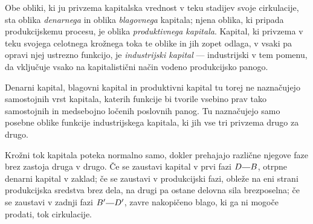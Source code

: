 \documentclass[kapital_02.tex]{subfiles}
\begin{document}
Obe obliki, ki ju privzema kapitalska vrednost v teku stadijev svoje cirkulacije, sta oblika \emph{denarnega} in oblika \emph{blagovnega} kapitala; njena oblika, ki pripada produkcijskemu procesu, je oblika \emph{produktivnega kapitala}. Kapital, ki privzema v teku svojega celotnega krožnega toka te oblike in jih zopet odlaga, v vsaki pa opravi njej ustrezno funkcijo, je \emph{industrijski kapital} --- industrijski v tem pomenu, da vključuje vsako na kapitalistični način vodeno produkcijsko panogo.

Denarni kapital, blagovni kapital in produktivni kapital tu torej ne naznačujejo samostojnih vrst kapitala, katerih funkcije bi tvorile vsebino prav tako samostojnih in medsebojno ločenih poslovnih panog. Tu naznačujejo samo posebne oblike funkcije industrijskega kapitala, ki jih vse tri privzema drugo za drugo.

Krožni tok kapitala poteka normalno samo, dokler prehajajo različne njegove faze brez zastoja druga v drugo. Če se zaustavi kapital v prvi fazi \(\KPED\KPEcrta\KPEB\), otrpne denarni kapital v zaklad; če se zaustavi v produkcijski fazi, obleže na eni strani produkcijska sredstva brez dela, na drugi pa ostane delovna sila brezposelna; če se zaustavi v zadnji fazi \(\KPEB'\KPEcrta\KPED'\), zavre nakopičeno blago, ki ga ni mogoče prodati, tok cirkulacije.
\end{document}
